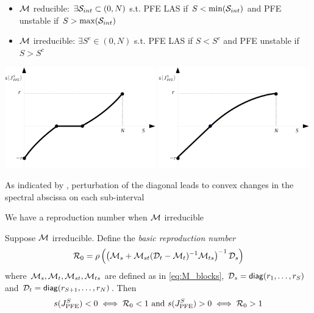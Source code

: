 \documentclass[aspectratio=169]{beamer}
\begin{document}
\begin{frame}
	\begin{itemize}
		\item $\M$ reducible: $\exists \S_{int}\subset(0,N)$ s.t. PFE LAS if $S<\min(\S_{int})$ and PFE unstable if $S>\max(\S_{int})$
		\item $\M$ irreducible: $\exists S^c\in(0,N)$ s.t. PFE LAS if $S<S^c$ and PFE unstable if $S>S^c$
	\end{itemize}
	\vfill
	\begin{center}
		\includegraphics[width=0.49\textwidth]{FIGS/bifurcation_case_interval}
		\includegraphics[width=0.49\textwidth]{FIGS/bifurcation_case_unique}
	\end{center}
\end{frame}


\begin{frame}
	As indicated by \cite{DeutschNeumann1985}, perturbation of the diagonal leads to convex changes in the spectral abscissa on each sub-interval
\end{frame}


\begin{frame}{We have a reproduction number when $\M$ irreducible}
	\begin{proposition}\label{prop:R0}
		Suppose $\M$ irreducible. 
		Define the \emph{basic reproduction number}
		\begin{equation}\label{eq:R0}
			\R_0 = \rho\left(
			\left(\M_s+\M_{st}(\D_t-\M_{t})^{-1}\M_{ts}\right)^{-1}\D_s
			\right)
		\end{equation}
		where $\M_s,\M_t,\M_{st},\M_{ts}$ are defined as in \eqref{eq:M_blocks}, $\D_s=\diag(r_1,\ldots,r_S)$ and $\D_t=\diag(r_{S+1},\ldots,r_N)$.
		Then
		\begin{equation}
			s(J_{\textrm{PFE}}^S)<0 \iff \R_0<1 \textrm{ and }
			s(J_{\textrm{PFE}}^S)>0 \iff \R_0>1
		\end{equation}
	\end{proposition}
\end{frame}
\end{document}
